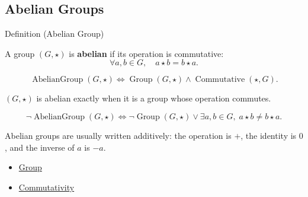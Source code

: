 \subsection*{Abelian Groups}
\label{subsec:abelian-groups}

\begin{definitionbox}{Definition (Abelian Group)}
\begin{definition}
\label{def:algebraic-abelian-group}
A group $(G,\star)$ is \textbf{abelian} if its operation is commutative:
\[
\forall a,b \in G,\quad a\star b=b\star a.
\]
\end{definition}
\end{definitionbox}

\begin{remark*}
\[
\operatorname{AbelianGroup}(G,\star)
\Longleftrightarrow
\operatorname{Group}(G,\star)
\land
\operatorname{Commutative}(\star,G).
\]
\end{remark*}

\begin{remark*}
$(G,\star)$ is abelian exactly when it is a group whose operation commutes.
\end{remark*}

\begin{remark*}
\[
\neg\operatorname{AbelianGroup}(G,\star)
\Longleftrightarrow
\neg\operatorname{Group}(G,\star)
\lor
\exists a,b\in G,\; a\star b\neq b\star a.
\]
\end{remark*}

\begin{remark*}[Interpretation]
Abelian groups are usually written additively: the operation is $+$, the
identity is $0$, and the inverse of $a$ is $-a$.
\end{remark*}

\begin{dependencies}
\begin{itemize}
  \item \hyperref[def:algebraic-group]{Group}
  \item \hyperref[def:algebraic-commutativity]{Commutativity}
\end{itemize}
\end{dependencies}
